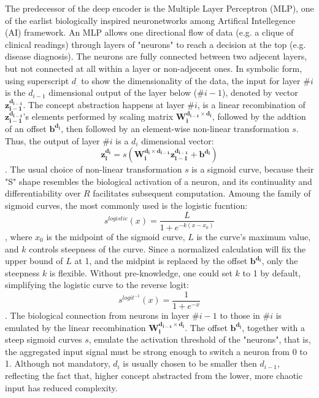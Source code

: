 The predecessor of the deep encoder is the Multiple Layer Perceptron (MLP), one of the earlist biologically inspired neuronetworks among Artifical Intellegence (AI) framework. An MLP allows one directional flow of data (e.g. a clique of clinical readings) through layers of "neurons" to reach a decision at the top (e.g. disease diagnosis). The neurons are fully connected between two adjecent layers, but not connected at all within a layer or non-adjecent ones. In symbolic form, using superscript $d_.$ to show the dimensionality of the data, the input for layer $\#i$ is the $d_{i-1}$ dimensional output of the layer below ($\#i-1$), denoted by vector $\boldsymbol{z_{i-1}^{d_{i-1}}}$.  The concept abstraction happens at layer $\#i$, is a linear recombination of $\boldsymbol{z_{i-1}^{d_{i-1}}}$'s elements performed by scaling matrix $\boldsymbol{W_i^{d_{i-1}\times d_i}}$, followed by the addtion of an offset $\boldsymbol{b^{d_i}}$, then followed by an element-wise non-linear transformation $s$. Thus, the output of layer $\#i$ is a $d_i$ dimensional vector:
\[ \boldsymbol{z_i^{d_i}} = s(\boldsymbol{W_i^{d_i\times d_{i-1}}z_{i-1}^{d_{i-1}}}+\boldsymbol{b^{d_i}})\].
The usual choice of non-linear transformation $s$ is a sigmoid curve, because their "S" shape resembles the biological activation of a neuron, and its continuality and differentiability over $R$ facilitates subsequent computation. Amoung the family of sigmoid curves, the most commonly used is the logistic fucntion: 
\[s^{logistic}(x)=\frac{L}{1+e^{-k(x-x_0)}}\],
where $x_0$ is the midpoint of the sigmoid curve, $L$ is the curve's maximum value, and $k$ controls steepness of the curve. Since a normalized calculation will fix the upper bound of $L$ at 1, and the midpint is replaced by the offset $\boldsymbol{b^{d_i}}$, only the steepness $k$ is flexible. Without pre-knowledge, one could set $k$ to 1 by default, simplifying the logistic curve to the reverse logit: 
\[s^{logit^{-1}}(x)=\frac{1}{1+e^{-x}}\].
The biological connection from neurons in layer $\#i-1$ to those in $\#i$ is emulated by the linear recombination $\boldsymbol{W_i^{d_{i-1} \times d_i}}$. The offset $\boldsymbol{b^{d_i}}$, together with a steep sigmoid curves $s$, emulate the activation threshold of the "neurons", that is, the aggregated input signal must be strong enough to switch a neuron from 0 to 1.
Although not mandatory, $d_i$ is usually chosen to be smaller then $d_{i-1}$, reflecting the fact that, higher concept abstracted from the lower, more chaotic input has reduced complexity. 

